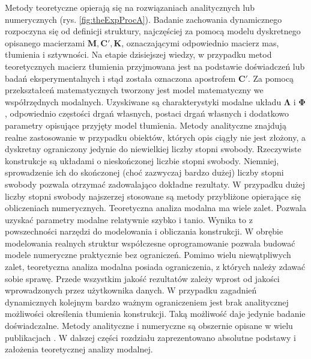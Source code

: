 Metody teoretyczne opierają się na rozwiązaniach analitycznych lub numerycznych (rys. \ref{fig:theExpProcA}). Badanie zachowania dynamicznego rozpoczyna się od definicji struktury, najczęściej za pomocą modelu dyskretnego opisanego macierzami $\mathbf{M}, \mathbf{C}', \mathbf{K}$, oznaczającymi odpowiednio macierz mas, tłumienia i sztywności. Na etapie dzisiejszej wiedzy, w przypadku metod teoretycznych macierz tłumienia przyjmowana jest na podstawie doświadczeń lub badań eksperymentalnych i stąd została oznaczona apostrofem $\mathbf{C'}$. Za pomocą przekształceń matematycznych tworzony jest model matematyczny we współrzędnych modalnych. Uzyskiwane są charakterystyki modalne układu $\mathbf{\Lambda}$ i $\mathbf{\Phi}$, odpowiednio częstości drgań własnych, postaci drgań własnych i dodatkowo parametry opisujące przyjęty model tłumienia. Metody analityczne znajdują realne zastosowanie w przypadku obiektów, których opis ciągły nie jest złożony, a dyskretny ograniczony jedynie do niewielkiej liczby stopni swobody. Rzeczywiste konstrukcje są układami o nieskończonej liczbie stopni swobody. Niemniej, sprowadzenie ich do skończonej (choć zazwyczaj bardzo dużej) liczby stopni swobody pozwala otrzymać zadowalająco dokładne rezultaty. W przypadku dużej liczby stopni swobody najszerzej stosowane są metody przybliżone opierające się obliczeniach numerycznych. Teoretyczna analiza modalna ma wiele zalet. Pozwala uzyskać parametry modalne relatywnie szybko i tanio. Wynika to z powszechności narzędzi do modelowania i obliczania konstrukcji. W obrębie modelowania realnych struktur współczesne oprogramowanie pozwala budować modele numeryczne praktycznie bez ograniczeń. Pomimo wielu niewątpliwych zalet, teoretyczna analiza modalna posiada ograniczenia, z których należy zdawać sobie sprawę. Przede wszystkim jakość rezultatów zależy wprost od jakości wprowadzonych przez użytkownika danych. W przypadku zagadnień dynamicznych kolejnym bardzo ważnym ograniczeniem jest brak analitycznej możliwości określenia tłumienia konstrukcji. Taką możliwość daje jedynie badanie doświadczalne. Metody analityczne i numeryczne są obszernie opisane w wielu publikacjach \parencite{Chmielewski1998,Chopra2012a,Rucka2014}. W dalszej części rozdziału zaprezentowano absolutne podstawy i założenia teoretycznej analizy modalnej.



